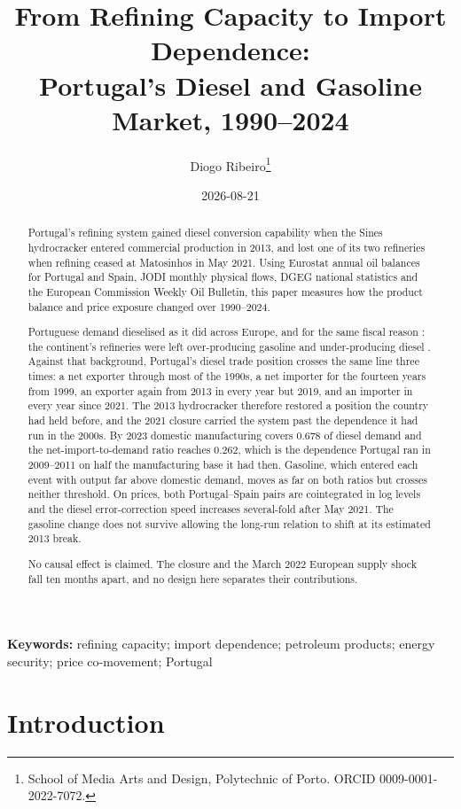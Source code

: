 \documentclass[11pt,a4paper]{article}
\title{From Refining Capacity to Import Dependence:\\
Portugal's Diesel and Gasoline Market, 1990--2024}
\author{Diogo Ribeiro\thanks{School of Media Arts and Design, Polytechnic of Porto.
ORCID 0009-0001-2022-7072.}}
\date{2026-08-21}
\begin{document}
\maketitle

\begin{abstract}
\noindent
Portugal's refining system gained diesel conversion capability when the Sines hydrocracker
entered commercial production in 2013, and lost one of its two refineries when refining ceased
at Matosinhos in May 2021. Using Eurostat annual oil balances for Portugal and Spain, JODI
monthly physical flows, DGEG national statistics and the European Commission Weekly Oil
Bulletin, this paper measures how the product balance and price exposure changed over
1990--2024.

Portuguese demand dieselised as it did across Europe, and for the same fiscal reason
\citep{harding2014diesel, silva2022different}: the continent's refineries were left over-producing
gasoline and under-producing diesel \citep{deboncourt2013refining}. Against that
background, Portugal's diesel trade position crosses the same line three times: a net exporter
through most of the 1990s, a net importer for the fourteen years from 1999, an exporter again
from 2013 in every year but 2019, and an importer in every year since 2021. The 2013
hydrocracker therefore restored a position the country had held before, and the 2021 closure
carried the system past the dependence it had run in the 2000s. By 2023 domestic manufacturing
covers $0.678$ of diesel demand and the net-import-to-demand ratio reaches $0.262$, which is the
dependence Portugal ran in 2009--2011 on half the manufacturing base it had then. Gasoline,
which entered each event with output far above domestic demand, moves as far on both ratios but
crosses neither threshold. On prices, both Portugal--Spain pairs are cointegrated in log levels
and the diesel error-correction speed increases several-fold after May 2021. The gasoline
change does not survive allowing the long-run relation to shift at its estimated 2013 break.

No causal effect is claimed. The closure and the March 2022 European supply shock fall ten
months apart, and no design here separates their contributions.
\end{abstract}

\vspace{1em}
\noindent\textbf{Keywords:} refining capacity; import dependence; petroleum products; energy
security; price co-movement; Portugal

\section{Introduction}
\label{sec:intro}
\end{document}
